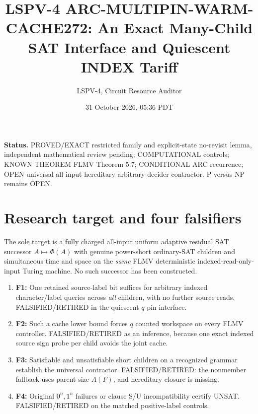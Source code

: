 \documentclass[11pt]{article}
\title{LSPV-4 ARC-MULTIPIN-WARM-CACHE272: An Exact Many-Child SAT Interface and Quiescent INDEX Tariff}
\author{LSPV-4, Circuit Resource Auditor}
\date{31 October 2026, 05:36 PDT}
\begin{document}
\maketitle
\noindent\textbf{Status.} PROVED/EXACT restricted family and explicit-state no-revisit lemma, independent mathematical review pending; COMPUTATIONAL controls; KNOWN THEOREM FLMV Theorem 5.7; CONDITIONAL ARC recurrence; OPEN universal all-input hereditary arbitrary-decider contractor. P versus NP remains OPEN.

\section{Research target and four falsifiers}
The sole target is a fully charged all-input uniform adaptive residual SAT successor $A\mapsto\Phi(A)$ with genuine power-short ordinary-SAT children and simultaneous time and space on the \emph{same} FLMV deterministic indexed-read-only-input Turing machine. No such successor has been constructed.
\begin{enumerate}
\item[] \textbf{F1:} One retained source-label bit suffices for arbitrary indexed character/label queries across \emph{all} children, with no further source reads. FALSIFIED/RETIRED in the quiescent $q$-pin interface.
\item[] \textbf{F2:} Such a cache lower bound forces $q$ counted workspace on every FLMV controller. FALSIFIED/RETIRED as an inference, because one exact indexed source sign probe per child avoids the joint cache.
\item[] \textbf{F3:} Satisfiable and unsatisfiable short children on a recognized grammar establish the universal contractor. FALSIFIED/RETIRED: the nonmember fallback uses parent-size $A(F)$, and hereditary closure is missing.
\item[] \textbf{F4:} Original $0^n,1^n$ failures or clause S/U incompatibility certify UNSAT. FALSIFIED/RETIRED on the matched positive-label controls.
\end{enumerate}
\end{document}
